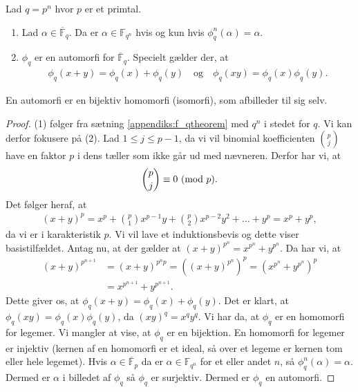 \begin{proposition}
\label{appendiks:support_prop}
Lad $q=p^n$ hvor $p$ er et primtal.
\begin{enumerate}
	\item Lad $\alpha \in \overline{\mathbb{F}}_q$. Da er $\alpha \in \mathbb{F}_{q^n}$ 
	hvis og kun hvis $\phi_{q}^{n}(\alpha) = \alpha$.
	\item $\phi_q$ er en automorfi for $\overline{\mathbb{F}}_q$. Specielt gælder der,
	at 
	\begin{align*}
		\phi_q (x+y) = \phi_q(x) + \phi_q(y) \quad \text{og} \quad \phi_q(xy) =
		 \phi_q(x)\phi_q(y).
	\end{align*}
\end{enumerate}
\end{proposition}
En automorfi er en bijektiv homomorfi (isomorfi), som afbilleder til sig selv.
\begin{proof}
(1) følger fra sætning \ref{appendiks:f_qtheorem} med $q^n$ i stedet for $q$. Vi kan derfor fokusere på (2). Lad $1 \leq j \leq p-1$, da vi vil binomial koefficienten 
$\binom{p}{j}$ have en faktor $p$ i dens tæller som ikke går ud med nævneren. Derfor har vi, at 
\begin{align*}
	\binom{p}{j} \equiv 0 \ (\mathrm{mod} \ p).
\end{align*}
Det følger heraf, at 
\begin{align*}
	(x + y)^p = x^p + \binom{p}{1}x^{p-1}y + \binom{p}{2}x^{p-2}y^2 + 
	\ldots + y^p = x^p + y^p,
\end{align*}
da vi er i karakteristik $p$. Vi vil lave et induktionsbevis og dette viser basistilfældet. Antag nu, at der gælder at $(x+y)^{p^n} = x^{p^n} + y^{p^n}$. Da har vi, at
\begin{align*}
	(x+y)^{p^{n+1}} &= (x+y)^{p^n p} = ((x+y)^{p^n})^p
	= (x^{p^n} + y^{p^n})^p \\
	&= x^{p^{n+1}} + y^{p^{n+1}}.
\end{align*}
Dette giver os, at $\phi_q(x+y) = \phi_q(x) + \phi_q(y)$. Det er klart, at 
$\phi_q(xy)=\phi_q(x) \phi_q(y)$, da $(xy)^q = x^q y^q$. Vi har da, at $\phi_q$ er en homomorfi for legemer. Vi mangler at vise, at $\phi_q$ er en bijektion. En homomorfi for legemer er injektiv (kernen af en homomorfi er et ideal, så over et legeme er kernen tom eller hele legemet). Hvis $\alpha \in \overline{\mathbb{F}}_p$ da er 
$\alpha \in \mathbb{F}_{q^n}$ for et eller andet $n$, så $\phi_{q}^{n}(\alpha) = \alpha$. Dermed er $\alpha$ i billedet af $\phi_q$ så $\phi_q$ er surjektiv. Dermed er $\phi_q$ en automorfi.
\end{proof}

